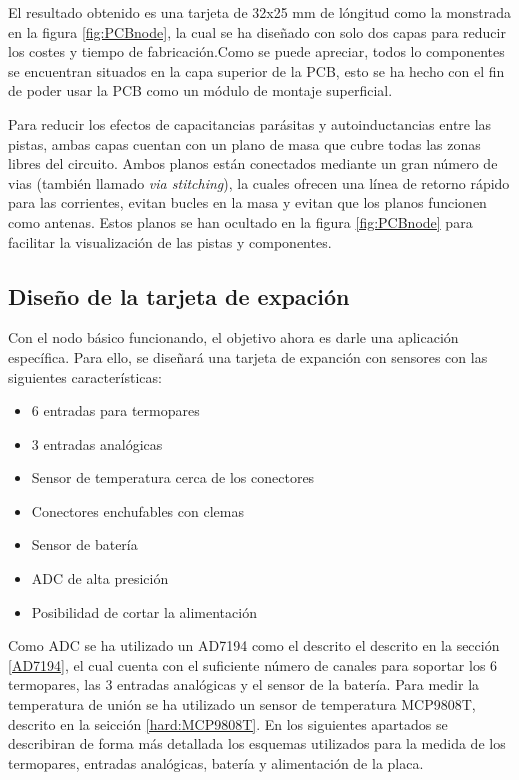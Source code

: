         
        El resultado obtenido es una tarjeta de 32x25 mm de lóngitud como la monstrada en la figura \ref{fig:PCBnode}, la cual se ha diseñado con solo dos capas para reducir los costes y tiempo de fabricación.Como se puede apreciar, todos lo componentes se encuentran situados en la capa superior de la PCB, esto se ha hecho con el fin de poder usar la PCB como un módulo de montaje superficial. 
        
        Para reducir los efectos de capacitancias parásitas y autoinductancias entre las pistas, ambas capas cuentan con un plano de masa que cubre todas las zonas libres del circuito. Ambos planos están conectados mediante un gran número de vias (también llamado \textit{via stitching}), la cuales ofrecen una línea de retorno rápido para las corrientes, evitan bucles en la masa y evitan que los planos funcionen como antenas. Estos planos se han ocultado en la figura \ref{fig:PCBnode} para facilitar la visualización de las pistas y componentes.
        
	\subsection{Diseño de la tarjeta de expación}
	
	Con el nodo básico funcionando, el objetivo ahora es darle una aplicación específica. Para ello, se diseñará una tarjeta de expanción con sensores con las siguientes características:
	
	\begin{itemize}
		\item 6 entradas para termopares 
		\item 3 entradas analógicas
		\item Sensor de temperatura cerca de los conectores
		\item Conectores enchufables con clemas
		\item Sensor de batería
		\item ADC de alta presición 
		\item Posibilidad de cortar la alimentación
		
	\end{itemize}	
	
	Como ADC se ha utilizado un AD7194 como el descrito el descrito en la sección \ref{AD7194}, el cual cuenta con el suficiente número de canales para soportar los 6 termopares, las 3 entradas analógicas y el sensor de la batería. Para medir la temperatura de unión se ha utilizado un sensor de temperatura MCP9808T, descrito en la seicción \ref{hard:MCP9808T}. En los siguientes apartados se describiran de forma más detallada los esquemas utilizados para la medida de los termopares, entradas analógicas, batería y alimentación de la placa.
	
